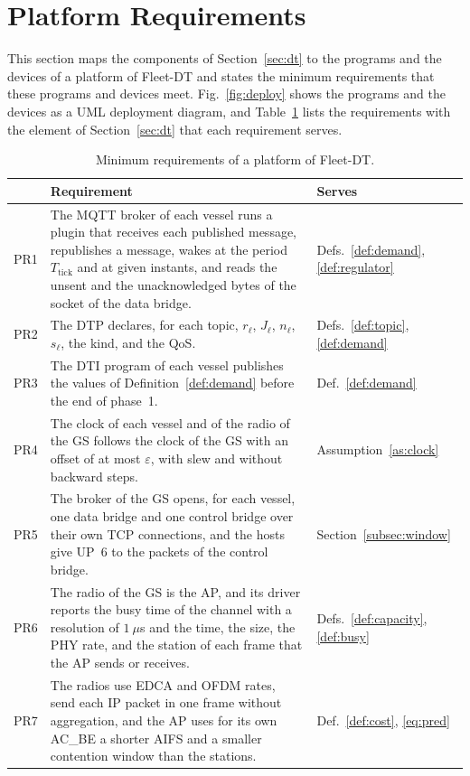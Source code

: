\section{Platform Requirements}\label{sec:platform}

This section maps the components of Section~\ref{sec:dt} to the programs and the devices of a platform of Fleet-DT and states the minimum requirements that these programs and devices meet. Fig.~\ref{fig:deploy} shows the programs and the devices as a UML deployment diagram, and Table~\ref{tab:req} lists the requirements with the element of Section~\ref{sec:dt} that each requirement serves.

\begin{table}[t]
\caption{Minimum requirements of a platform of Fleet-DT.}\label{tab:req}
\centering\footnotesize
\begin{tabular}{@{}lp{5.4cm}l@{}}
\toprule
& Requirement & Serves \\
\midrule
PR1 & The MQTT broker of each vessel runs a plugin that receives each published message, republishes a message, wakes at the period $T_{\mathrm{tick}}$ and at given instants, and reads the unsent and the unacknowledged bytes of the socket of the data bridge. & Defs.~\ref{def:demand}, \ref{def:regulator} \\
PR2 & The DTP declares, for each topic, $r_\ell$, $J_\ell$, $n_\ell$, $s_\ell$, the kind, and the QoS. & Defs.~\ref{def:topic}, \ref{def:demand} \\
PR3 & The DTI program of each vessel publishes the values of Definition~\ref{def:demand} before the end of phase~1. & Def.~\ref{def:demand} \\
PR4 & The clock of each vessel and of the radio of the GS follows the clock of the GS with an offset of at most $\varepsilon$, with slew and without backward steps. & Assumption~\ref{as:clock} \\
PR5 & The broker of the GS opens, for each vessel, one data bridge and one control bridge over their own TCP connections, and the hosts give UP~6 to the packets of the control bridge. & Section~\ref{subsec:window} \\
PR6 & The radio of the GS is the AP, and its driver reports the busy time of the channel with a resolution of $1~\mu$s and the time, the size, the PHY rate, and the station of each frame that the AP sends or receives. & Defs.~\ref{def:capacity}, \ref{def:busy} \\
PR7 & The radios use EDCA and OFDM rates, send each IP packet in one frame without aggregation, and the AP uses for its own AC\_BE a shorter AIFS and a smaller contention window than the stations. & Def.~\ref{def:cost}, \eqref{eq:pred} \\

\end{tabular}
\end{table}
